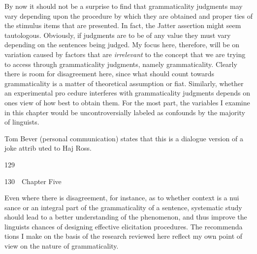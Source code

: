 \begin{styleTextbody}
By now it should not be a surprise to find that grammaticality judgments may vary depending upon the procedure by which they are obtained and proper\- ties of the stimulus items that are presented. In fact, the Jatter assertion might seem tautologous. Obviously, if judgments are to be of any value they must vary depending on the sentences being judged. My focus here, therefore, will be on variation caused by factors that are \textit{irrelevant}\textit{ }to the concept that we are trying to access through grammaticality judgments, namely grammaticality. Clearly there is room for disagreement here, since what should count towards grammaticality is a matter of theoretical assumption or fiat. Similarly, whether an experimental pro\- cedure interferes with grammaticality judgments depends on one{\textquotesingle}s view of how best to obtain them. For the most part, the variables I examine in this chapter would be uncontroversially labeled as confounds by the majority of linguists.
\end{styleTextbody}


\begin{listWWNumxxxivleveli}
\item 
\setcounter{listWWNumxxxivlevelii}{0}
\begin{listWWNumxxxivlevelii}
\item 
\setcounter{listWWNumxxxivleveliii}{0}
\begin{listWWNumxxxivleveliii}
\item 
\begin{styleStandard}
Tom Bever (personal communication) states that this is a dialogue version of a joke attrib\- uted to Haj Ross.
\end{styleStandard}


\end{listWWNumxxxivleveliii}
\end{listWWNumxxxivlevelii}
\end{listWWNumxxxivleveli}
\begin{styleStandard}
129
\end{styleStandard}


\clearpage\setcounter{page}{1}\begin{styleStandard}
130\ \ Chapter Five
\end{styleStandard}


\begin{styleTextbody}
Even where there is disagreement, for instance, as to whether context is a nui\- sance or an integral part of the grammaticality of a sentence, systematic study should lead to a better understanding of the phenomenon, and thus improve the linguist{\textquotesingle}s chances of designing effective elicitation procedures. The recommenda\- tions I make on the basis of the research reviewed here reflect my own point of view on the nature of grammaticality.
\end{styleTextbody}


